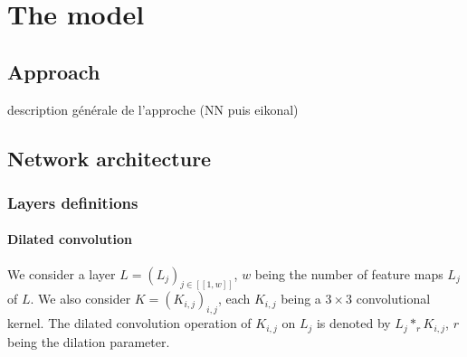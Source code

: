\documentclass{article}
\begin{document}
\section{The model}
    \subsection{Approach}
    description générale de l'approche (NN puis eikonal)
    \subsection{Network architecture}
        \subsubsection{Layers definitions}

            \paragraph{Dilated convolution}\label{par:dilated} We consider a layer $L=(L_j)_{j\in [\![1,w]\!]}$, $w$ being the number of feature maps $L_j$ of $L$. We also consider $K=(K_{i,j})_{i,j}$, each $K_{i,j}$ being a $3\times 3$ convolutional kernel. The dilated convolution operation of $K_{i,j}$ on $L_j$ is denoted by $L_j*_r K_{i,j}$, $r$ being the dilation parameter.
\end{document}
